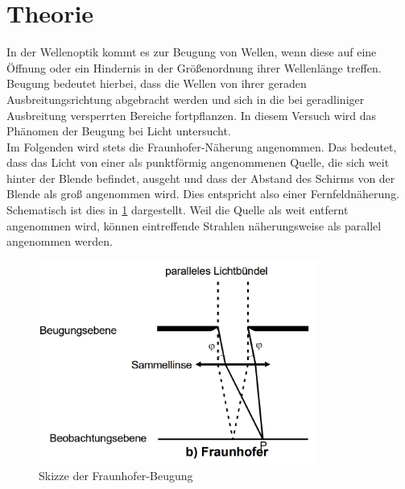 \section{Theorie}
\label{sec:Theorie}
In der Wellenoptik kommt es zur Beugung von Wellen, wenn diese auf eine Öffnung oder
ein Hindernis in der Größenordnung ihrer Wellenlänge treffen. Beugung bedeutet hierbei,
dass die Wellen von ihrer geraden Ausbreitungsrichtung abgebracht werden und sich in
die bei geradliniger Ausbreitung versperrten Bereiche fortpflanzen. In diesem Versuch
wird das Phänomen der Beugung bei Licht untersucht. \\
Im Folgenden wird stets die Fraunhofer-Näherung angenommen. Das bedeutet, dass das Licht
von einer als punktförmig angenommenen Quelle, die sich weit hinter der Blende befindet,
ausgeht und dass der Abstand des Schirms von der Blende als groß angenommen wird. Dies
entspricht also einer Fernfeldnäherung. Schematisch ist dies in \ref{fig:fraunhofer}
dargestellt. Weil die Quelle als weit entfernt angenommen wird, können eintreffende
Strahlen näherungsweise als parallel angenommen werden.

\begin{figure}
  \centering
  \includegraphics[width=260pt]{data/fraunhofer.png}
  \caption{Skizze der Fraunhofer-Beugung \cite{Versuchsanleitung}}
  \label{fig:fraunhofer}
\end{figure}

